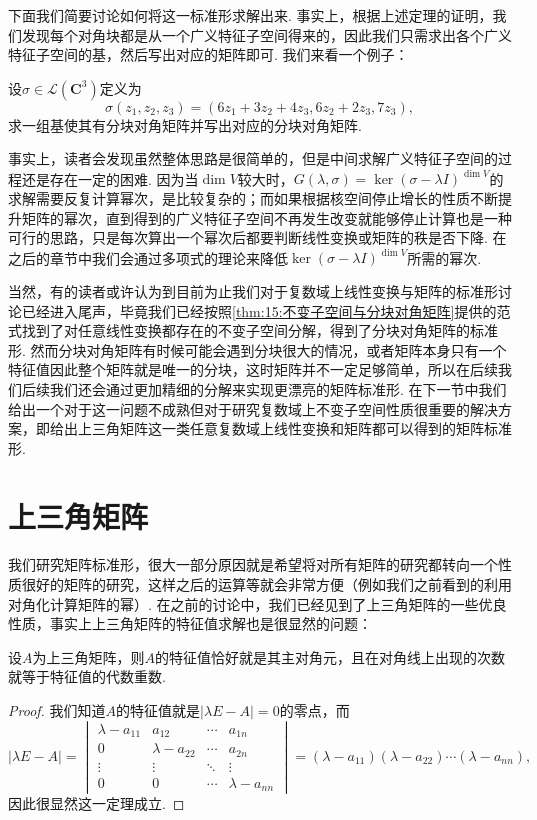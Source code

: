 下面我们简要讨论如何将这一标准形求解出来. 事实上，根据上述定理的证明，我们发现每个对角块都是从一个广义特征子空间得来的，因此我们只需求出各个广义特征子空间的基，然后写出对应的矩阵即可. 我们来看一个例子：
\begin{example}
    设$\sigma\in \mathcal{L}(\mathbf{C}^3)$定义为
    \[\sigma(z_1,z_2,z_3)=(6z_1+3z_2+4z_3,6z_2+2z_3,7z_3),\]求一组基使其有分块对角矩阵并写出对应的分块对角矩阵.
\end{example}

\begin{solution}

\end{solution}

事实上，读者会发现虽然整体思路是很简单的，但是中间求解广义特征子空间的过程还是存在一定的困难. 因为当$\dim V$较大时，$G(\lambda,\sigma)=\ker (\sigma-\lambda I)^{\dim V}$的求解需要反复计算幂次，是比较复杂的；而如果根据核空间停止增长的性质不断提升矩阵的幂次，直到得到的广义特征子空间不再发生改变就能够停止计算也是一种可行的思路，只是每次算出一个幂次后都要判断线性变换或矩阵的秩是否下降. 在之后的章节中我们会通过多项式的理论来降低$\ker (\sigma-\lambda I)^{\dim V}$所需的幂次.

当然，有的读者或许认为到目前为止我们对于复数域上线性变换与矩阵的标准形讨论已经进入尾声，毕竟我们已经按照\autoref{thm:15:不变子空间与分块对角矩阵}提供的范式找到了对任意线性变换都存在的不变子空间分解，得到了分块对角矩阵的标准形. 然而分块对角矩阵有时候可能会遇到分块很大的情况，或者矩阵本身只有一个特征值因此整个矩阵就是唯一的分块，这时矩阵并不一定足够简单，所以在后续我们后续我们还会通过更加精细的分解来实现更漂亮的矩阵标准形. 在下一节中我们给出一个对于这一问题不成熟但对于研究复数域上不变子空间性质很重要的解决方案，即给出上三角矩阵这一类任意复数域上线性变换和矩阵都可以得到的矩阵标准形.

\section{上三角矩阵}

我们研究矩阵标准形，很大一部分原因就是希望将对所有矩阵的研究都转向一个性质很好的矩阵的研究，这样之后的运算等就会非常方便（例如我们之前看到的利用对角化计算矩阵的幂）. 在之前的讨论中，我们已经见到了上三角矩阵的一些优良性质，事实上上三角矩阵的特征值求解也是很显然的问题：
\begin{theorem}
    设$A$为上三角矩阵，则$A$的特征值恰好就是其主对角元，且在对角线上出现的次数就等于特征值的代数重数.
\end{theorem}
\begin{proof}
    我们知道$A$的特征值就是$|\lambda E-A|=0$的零点，而
    \[|\lambda E-A|=\begin{vmatrix}
            \lambda-a_{11} & a_{12}         & \cdots & a_{1n}         \\
            0              & \lambda-a_{22} & \cdots & a_{2n}         \\
            \vdots         & \vdots         & \ddots & \vdots         \\
            0              & 0              & \cdots & \lambda-a_{nn}
        \end{vmatrix}=(\lambda-a_{11})(\lambda-a_{22})\cdots(\lambda-a_{nn}),\]
    因此很显然这一定理成立.
\end{proof}

